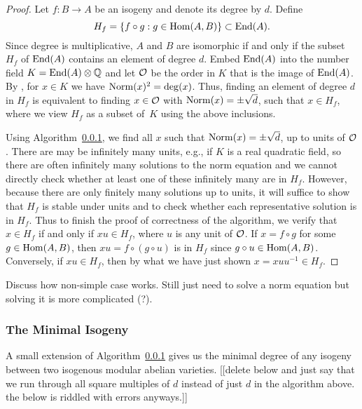 \documentclass{article}
\begin{document}
\begin{proof}
	Let $f:B \to A$ be an isogeny and denote its degree by $d$. Define
	$$H_f = \{f \circ g: g \in \operatorname{Hom}(A,B)\} \subset \operatorname{End}(A).$$
	Since
	degree is multiplicative, $A$ and $B$ are isomorphic if and only if
	the subset $H_f$ of $\operatorname{End}(A)$ contains an element of degree $d$. Embed $\operatorname{End}(A)$ into the
	number field $K =
		\operatorname{End}(A) \otimes \mathbb{Q}$ and let $\mathcal{O}$ be the order in $K$ that is the image of
	$\operatorname{End}(A)$. By \cite[Prop~12.12]{milne:abvars}, for
	$x \in K$ we have $\operatorname{Norm}(x)^2 = \deg(x)$. Thus, finding an element
	of degree $d$ in $H_f$ is equivalent to finding $x \in \mathcal{O}$ with
	$\operatorname{Norm}(x) = \pm \sqrt{d}$, such that $x \in H_f$, where we view
	$H_f$ as a subset of~$K$ using the above inclusions.

	Using Algorithm~\ref{}, we find all $x$ such that $\operatorname{Norm}(x) = \pm
		\sqrt{d}$, up to units of $\mathcal{O}$.  There are may be infinitely many
	units, e.g., if $K$ is a real quadratic field, so there are often
	infinitely many solutions to the norm equation and we cannot directly
	check whether at least one of these infinitely many are in $H_f$.
	However, because there are only finitely many solutions up to units,
	it will suffice to show that $H_f$ is stable under units and to check
	whether each representative solution is in $H_f$.  Thus to finish
	the proof of correctness of the algorithm, we verify that $x\in H_f$ if
	and only if $xu \in H_f$, where $u$ is any unit of $\mathcal{O}$.  If $x = f
		\circ g$ for some $g \in \operatorname{Hom}(A,B)$, then $xu = f \circ (g \circ u)$
	is in $H_f$ since $g \circ u \in \operatorname{Hom}(A,B)$.  Conversely, if $xu\in
		H_f$, then by what we have just shown $x = xuu^{-1} \in H_f$.
\end{proof}

Discuss how non-simple case works.  Still just need to solve a norm
equation but solving it is more complicated (?).

\subsubsection{The Minimal Isogeny}

A small extension of Algorithm~\ref{} gives us the minimal degree of any
isogeny between two isogenous modular abelian varieties.
	[[delete below and just say that we run through all square multiples
				of $d$ instead of just $d$ in the algorithm above.  the below
				is riddled with errors anyways.]]
\end{document}
